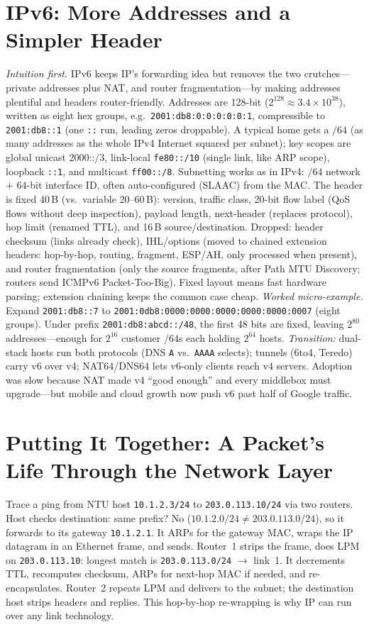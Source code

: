 \section{IPv6: More Addresses and a Simpler Header}\label{sec:ipv6}
\emph{Intuition first.} IPv6 keeps IP's forwarding idea but removes the two crutches---private addresses plus NAT, and router fragmentation---by making addresses plentiful and headers router-friendly. Addresses are 128-bit ($2^{128}\approx3.4\times10^{38}$), written as eight hex groups, e.g.\ \texttt{2001:db8:0:0:0:0:0:1}, compressible to \texttt{2001:db8::1} (one \texttt{::} run, leading zeros droppable). A typical home gets a $/64$ (as many addresses as the whole IPv4 Internet squared per subnet); key scopes are global unicast $2000\texttt{::}/3$, link-local \texttt{fe80::/10} (single link, like ARP scope), loopback \texttt{::1}, and multicast \texttt{ff00::/8}. Subnetting works as in IPv4: $/64$ network $+$ $64$-bit interface ID, often auto-configured (SLAAC) from the MAC.
The header is fixed 40\,B (vs.\ variable 20--60\,B): version, traffic class, 20-bit flow label (QoS flows without deep inspection), payload length, next-header (replaces protocol), hop limit (renamed TTL), and 16\,B source/destination. Dropped: header checksum (links already check), IHL/options (moved to chained extension headers: hop-by-hop, routing, fragment, ESP/AH, only processed when present), and router fragmentation (only the source fragments, after Path MTU Discovery; routers send ICMPv6 Packet-Too-Big). Fixed layout means fast hardware parsing; extension chaining keeps the common case cheap.
\emph{Worked micro-example.} Expand \texttt{2001:db8::7} to \texttt{2001:0db8:0000:0000:0000:0000:0000:0007} (eight groups). Under prefix \texttt{2001:db8:abcd::/48}, the first 48 bits are fixed, leaving $2^{80}$ addresses---enough for $2^{16}$ customer $/64$s each holding $2^{64}$ hosts. \emph{Transition:} dual-stack hosts run both protocols (DNS \texttt{A} vs.\ \texttt{AAAA} selects); tunnels (6to4, Teredo) carry v6 over v4; NAT64/DNS64 lets v6-only clients reach v4 servers. Adoption was slow because NAT made v4 ``good enough'' and every middlebox must upgrade---but mobile and cloud growth now push v6 past half of Google traffic.
\section{Putting It Together: A Packet's Life Through the Network Layer}\label{sec:packet-life}
Trace a ping from NTU host \texttt{10.1.2.3/24} to \texttt{203.0.113.10/24} via two routers.
Host checks destination: same prefix? No ($10.1.2.0/24 \neq 203.0.113.0/24$), so it forwards to its gateway \texttt{10.1.2.1}.
It ARPs for the gateway MAC, wraps the IP datagram in an Ethernet frame, and sends.
Router~1 strips the frame, does LPM on \texttt{203.0.113.10}: longest match is \texttt{203.0.113.0/24} $\to$ link~1.
It decrements TTL, recomputes checksum, ARPs for next-hop MAC if needed, and re-encapsulates.
Router~2 repeats LPM and delivers to the subnet; the destination host strips headers and replies.
This hop-by-hop re-wrapping is why IP can run over any link technology.


